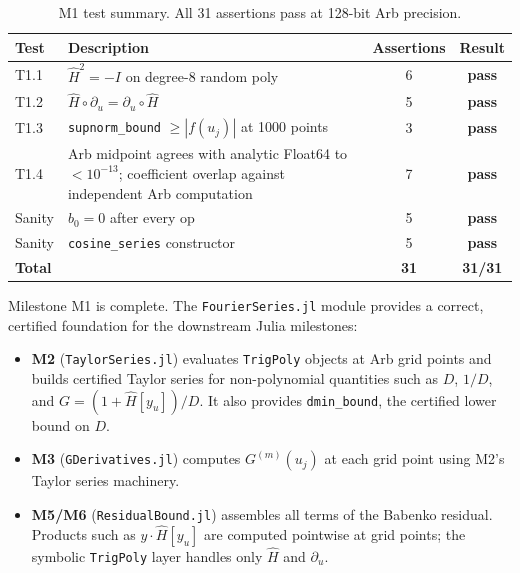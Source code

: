 \documentclass[11pt]{article}
\theoremstyle{definition}
\begin{document}
\begin{table}[H]
\centering
\begin{tabular}{llcc}
\toprule
Test & Description & Assertions & Result \\
\midrule
T1.1 & $\hat H^2 = -I$ on degree-8 random poly & 6 & \textcolor{green!60!black}{\textbf{pass}} \\
T1.2 & $\hat H \circ \partial_u = \partial_u \circ \hat H$ & 5 & \textcolor{green!60!black}{\textbf{pass}} \\
T1.3 & \texttt{supnorm\_bound} $\ge |f(u_j)|$ at 1000 points & 3 & \textcolor{green!60!black}{\textbf{pass}} \\
T1.4 & Arb midpoint agrees with analytic Float64 to $< 10^{-13}$; coefficient
       overlap against independent Arb computation & 7 & \textcolor{green!60!black}{\textbf{pass}} \\
Sanity & $b_0 = 0$ after every op & 5 & \textcolor{green!60!black}{\textbf{pass}} \\
Sanity & \texttt{cosine\_series} constructor & 5 & \textcolor{green!60!black}{\textbf{pass}} \\
\midrule
\textbf{Total} & & \textbf{31} & \textcolor{green!60!black}{\textbf{31/31}} \\
\bottomrule
\end{tabular}
\caption{M1 test summary. All 31 assertions pass at 128-bit Arb precision.}
\end{table}

Milestone M1 is complete. The \texttt{FourierSeries.jl} module provides a
correct, certified foundation for the downstream Julia milestones:
\begin{itemize}
  \item \textbf{M2} (\texttt{TaylorSeries.jl}) evaluates \texttt{TrigPoly}
        objects at Arb grid points and builds certified Taylor series for
        non-polynomial quantities such as $D$, $1/D$, and $G = (1+\hat H[y_u])/D$.
        It also provides \texttt{dmin\_bound}, the certified lower bound on $D$.
  \item \textbf{M3} (\texttt{GDerivatives.jl}) computes $G^{(m)}(u_j)$ at each
        grid point using M2's Taylor series machinery.
  \item \textbf{M5/M6} (\texttt{ResidualBound.jl}) assembles all terms of the
        Babenko residual. Products such as $y \cdot \hat H[y_u]$ are computed
        pointwise at grid points; the symbolic \texttt{TrigPoly} layer handles
        only $\hat H$ and $\partial_u$.
\end{itemize}
\end{document}
